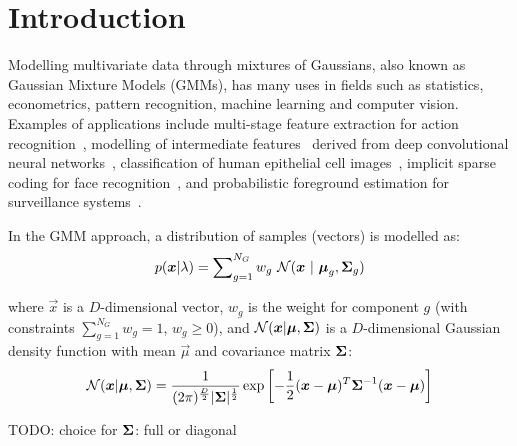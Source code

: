 \section{Introduction}

Modelling multivariate data through mixtures of Gaussians, also known as Gaussian Mixture Models (GMMs),
has many uses in fields such as statistics, econometrics, pattern recognition, machine learning and computer vision.
Examples of applications include
multi-stage feature extraction for action recognition~\cite{Carvajal_2016a},
modelling of intermediate features~\cite{Ge_ICIP_2015} derived from deep convolutional neural networks~\cite{Ge_2016,LeCun_Nature_2015},
classification of human epithelial cell images~\cite{Wiliem_PR_2014},
implicit sparse coding for face recognition~\cite{Wong_2014},
and probabilistic foreground estimation for surveillance systems~\cite{Reddy_2013}.

In the GMM approach, a distribution of samples (vectors) is modelled as:
%
\begin{equation}
  p({\boldsymbol{x}} | \lambda) = \sum\nolimits_{g=1}^{N_G} w_g ~ {{\mathcal{N}}}( {\boldsymbol{x}} ~|~ {\boldsymbol{\mu}}_g, {\boldsymbol{\Sigma}}_g )
\end{equation}

\noindent
where $\Vec{x}$ is a $D$-dimensional vector,
$w_g$ is the weight for component $g$ (with constraints $\sum\nolimits_{g=1}^{N_G} w_g = 1$, $w_g \geq 0$),
and
${{\mathcal{N}}}( {\boldsymbol{x}} | {\boldsymbol{\mu}}, {\boldsymbol{\Sigma}})$ is a $D$-dimensional Gaussian density function with mean $\Vec{\mu}$ and covariance matrix ${\boldsymbol{\Sigma}}$:
%
\begin{equation}
  {{\mathcal{N}}}( {\boldsymbol{x}} | {\boldsymbol{\mu}}, {\boldsymbol{\Sigma}} )  = 
  \frac{1}{ (2\pi)^{\frac{D}{2}} | {\boldsymbol{\Sigma}}|^{\frac{1}{2}} }
  \exp \left[ -\frac{1}{2} ({\boldsymbol{x}}-{\boldsymbol{\mu}})^T {\boldsymbol{\Sigma}}^{-1} ({\boldsymbol{x}}-{\boldsymbol{\mu}}) \right]
  \label{eqn:gaussian}
\end{equation}%

TODO: choice for ${\boldsymbol{\Sigma}}$: full or diagonal

